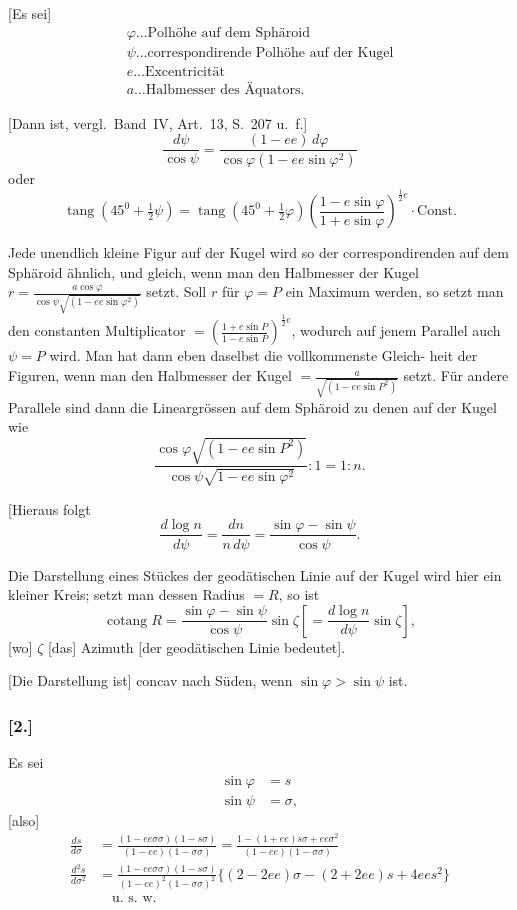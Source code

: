 \documentclass[12pt,a4paper]{article}
\theoremstyle{plain}
\theoremstyle{definition}
\theoremstyle{remark}
\newcommand{\tang}{\operatorname{tang}}
\newcommand{\cotang}{\operatorname{cotang}}
\newcommand{\ee}{\mathit{ee}}
\begin{document}
[Es sei]
\[
\begin{array}{lcl}
\varphi \ldots \text{Polhöhe auf dem Sphäroid} \\
\psi \ldots \text{correspondirende Polhöhe auf der Kugel} \\
e \ldots \text{Excentricität} \\
a \ldots \text{Halbmesser des Äquators.}
\end{array}
\]

[Dann ist, vergl.~Band~IV, Art.~13, S.~207 u.~f.]
\[
\frac{d\psi}{\cos\psi} = \frac{(1 - \ee)\,d\varphi}{\cos\varphi(1 - \ee\sin\varphi^2)}
\]
oder
\[
\tang(45^0 + \tfrac{1}{2}\psi) = \tang(45^0 + \tfrac{1}{2}\varphi)\left(\frac{1 - e\sin\varphi}{1 + e\sin\varphi}\right)^{\frac{1}{2}e} \cdot \text{Const.}
\]

Jede unendlich kleine Figur auf der Kugel wird so der correspondirenden
auf dem Sphäroid ähnlich, und gleich, wenn man den Halbmesser der Kugel
$r = \frac{a\cos\varphi}{\cos\psi\sqrt{(1 - \ee\sin\varphi^2)}}$ setzt. Soll $r$ für $\varphi = P$ ein Maximum werden, so setzt
man den constanten Multiplicator $= \left(\frac{1 + e\sin P}{1 - e\sin P}\right)^{\frac{1}{2}e}$, wodurch auf jenem Parallel
auch $\psi = P$ wird. Man hat dann eben daselbst die vollkommenste Gleich-\newline
heit der Figuren, wenn man den Halbmesser der Kugel $= \frac{a}{\sqrt{(1 - \ee\sin P^2)}}$ setzt.
Für andere Parallele sind dann die Lineargrössen auf dem Sphäroid zu denen
auf der Kugel wie
\[
\frac{\cos\varphi\sqrt{(1 - \ee\sin P^2)}}{\cos\psi\sqrt{1 - \ee\sin\varphi^2}} : 1 = 1 : n.
\]

[Hieraus folgt
\[
\frac{d\log n}{d\psi} = \frac{dn}{n\,d\psi} = \frac{\sin\varphi - \sin\psi}{\cos\psi}.
\]

Die Darstellung eines Stückes der geodätischen Linie auf der Kugel wird
hier ein kleiner Kreis; setzt man dessen Radius $= R$, so ist
\[
\cotang R = \frac{\sin\varphi - \sin\psi}{\cos\psi}\sin\zeta \left[= \frac{d\log n}{d\psi}\sin\zeta\right],
\]
[wo] $\zeta$ [das] Azimuth [der geodätischen Linie bedeutet].

[Die Darstellung ist] concav nach Süden, wenn $\sin\varphi > \sin\psi$ ist.

\subsubsection*{[2.]}
Es sei
\[
\begin{aligned}
\sin\varphi &= s \\
\sin\psi &= \sigma,
\end{aligned}
\]
[also]
\[
\begin{aligned}
\frac{ds}{d\sigma} &= \frac{(1 - \ee\sigma\sigma)(1 - s\sigma)}{(1 - \ee)(1 - \sigma\sigma)} = \frac{1 - (1 + \ee)s\sigma + \ee\sigma^2}{(1 - \ee)(1 - \sigma\sigma)} \\
\frac{d^2s}{d\sigma^2} &= \frac{(1 - \ee\sigma\sigma)(1 - s\sigma)}{(1 - \ee)^2(1 - \sigma\sigma)^2}\{(2 - 2\ee)\sigma - (2 + 2\ee)s + 4\ee s^2\} \\
&\quad\text{u.~s.~w.}
\end{aligned}
\]
\end{document}
